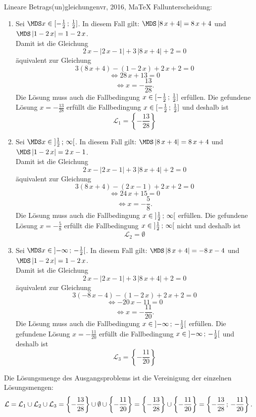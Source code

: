\begin{MAufgabe}{Lineare Betrags(un)gleichungen}{vr, 2016, MaTeX}
 Fallunterscheidung: 

 \begin{enumerate} 
 \item Sei $ \MDS x\in[ - \frac{1}{2} \, \MIntvlSep \, \frac{1}{2}]$. 
 In diesem Fall gilt: 
  $ \MDS \left| 8\, x + 4\right|=8\, x + 4$ und $ \MDS \left| 1 - 2\, x\right|=1 - 2\, x$. \\ 
 Damit ist die Gleichung 
 $$ 
2\, x - \left|2\, x - 1\right| + 3\, \left|8\, x + 4\right| + 2= 0
$$
 \"aquivalent zur Gleichung
 $$ 
3\left(8\, x + 4\right)-\left( 1 - 2\, x\right)+2\, x+2= 0 
$$  
$$ 
 \Leftrightarrow 28\, x + 13= 0 
$$  
$$ \Leftrightarrow x = - \frac{13}{28} . 
 $$ 
 Die L\"osung muss auch die Fallbedingung $x\in [ - \frac{1}{2} \, ; \, \frac{1}{2}] $ erf\"ullen. Die gefundene L\"osung $x=- \frac{13}{28}$ erf\"ullt die Fallbedingung  $x\in [ - \frac{1}{2} \, ; \, \frac{1}{2}]$ und deshalb ist  $$
 \mathcal{L}_{1}=\left\{- \frac{13}{28}\right\}
 $$ 
\item Sei $ \MDS x\in\MoIl  \frac{1}{2} \, \MIntvlSep \, \infty\MoIr $. 
 In diesem Fall gilt: 
  $ \MDS \left| 8\, x + 4\right|=8\, x + 4$ und $ \MDS \left| 1 - 2\, x\right|=2\, x - 1$. \\ 
 Damit ist die Gleichung 
 $$ 
2\, x - \left|2\, x - 1\right| + 3\, \left|8\, x + 4\right| + 2= 0
$$
 \"aquivalent zur Gleichung
 $$ 
3\left(8\, x + 4\right)-\left( 2\, x - 1\right)+2\, x+2= 0 
$$  
$$ 
 \Leftrightarrow 24\, x + 15= 0 
$$  
$$ \Leftrightarrow x = - \frac{5}{8} . 
 $$ 
 Die L\"osung muss auch die Fallbedingung $x\in \mbox{}]\mathopen{}  \frac{1}{2} \, ; \, \infty[\mbox{}  $ erf\"ullen. Die gefundene L\"osung $x=- \frac{5}{8}$ erf\"ullt die Fallbedingung  $x\in \mbox{}]\mathopen{}  \frac{1}{2} \, ; \, \infty[\mbox{} $ nicht und deshalb ist  $$
 \mathcal{L}_{2}=\emptyset 
 $$ 
\item Sei $ \MDS x\in\MoIl  -\infty \, \MIntvlSep \, - \frac{1}{2}\MoIr $. 
 In diesem Fall gilt: 
  $ \MDS \left| 8\, x + 4\right|= - 8\, x - 4$ und $ \MDS \left| 1 - 2\, x\right|=1 - 2\, x$. \\ 
 Damit ist die Gleichung 
 $$ 
2\, x - \left|2\, x - 1\right| + 3\, \left|8\, x + 4\right| + 2= 0
$$
 \"aquivalent zur Gleichung
 $$ 
3\left( - 8\, x - 4\right)-\left( 1 - 2\, x\right)+2\, x+2= 0 
$$  
$$ 
 \Leftrightarrow  - 20\, x - 11= 0 
$$  
$$ \Leftrightarrow x = - \frac{11}{20} . 
 $$ 
 Die L\"osung muss auch die Fallbedingung $x\in \mbox{}]\mathopen{}  -\infty \, ; \, - \frac{1}{2}[\mbox{}  $ erf\"ullen. Die gefundene L\"osung $x=- \frac{11}{20}$ erf\"ullt die Fallbedingung  $x\in \mbox{}]\mathopen{}  -\infty \, ; \, - \frac{1}{2}[\mbox{} $ und deshalb ist  $$
 \mathcal{L}_{3}=\left\{- \frac{11}{20}\right\}
 $$ 
 \end{enumerate} 
  Die L\"osungsmenge des Ausgangsproblems ist die Vereinigung der einzelnen L\"osungsmengen: 
$$ \mathcal{L} = \mathcal{L}_{1} \cup \mathcal{L}_{2} \cup \mathcal{L}_{3} 
 = \left\{- \frac{13}{28}\right\}\cup \emptyset\cup \left\{- \frac{11}{20}\right\} 
  =\left\{- \frac{13}{28}\right\}\cup\left\{- \frac{11}{20}\right\} 
  = \left\{- \frac{13}{28}\, ; \,- \frac{11}{20}\right\} 
 . $$ 
 

\end{MAufgabe}
